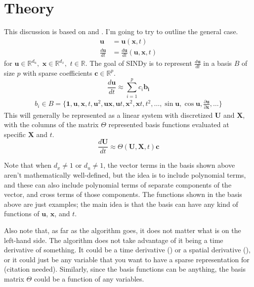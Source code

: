 \documentclass{article}
\let\vec\mathbf
\def\real{\mathbb{R}}
\begin{document}
\tableofcontents

\pagebreak
\section{Theory}

This discussion is based on \cite{brunton2016sindy} and \cite{shea2020sindy-bvp}.
I'm going to try to outline the general case. 
\begin{align}
\vec{u} &= \vec{u}(\vec{x}, t) \\
\frac{d\vec{u}}{dt} &= \frac{d\vec{u}}{dt}(\vec{u}, \vec{x}, t)
\end{align}
for $\vec{u} \in \real^{d_u}, \,\, \vec{x} \in \real^{d_x}, \,\, t \in \real$.
The goal of SINDy is to represent $\frac{d\vec{u}}{dt}$ in a basis $B$ of size
$p$ with sparse coefficients $\vec{c} \in \real^p$.
\begin{equation}
\frac{d\vec{u}}{dt} \approx \sum_{i=1}^p c_i \vec{b_i}
\end{equation}
\begin{align}
b_i \in B = \{\vec{1}, \vec{u}, \vec{x}, t, \vec{u}^2, \vec{u}\vec{x},\vec{u}t,\vec{x}^2,\vec{x}t,t^2,\hdots,\sin\vec{u},\cos{\vec{u}}, \frac{\partial\vec{u}}{\partial \vec{x}},\hdots\}
\end{align}
This will generally be represented as a linear system with discretized $\vec{U}$
and $\vec{X}$, with the columns of the matrix $\Theta$ represented basis
functions evaluated at specific $\vec{X}$ and $t$.
\begin{equation}\label{eq:basis-system}
\frac{d\vec{U}}{dt} \approx \Theta(\vec{U}, \vec{X}, t) \vec{c}
\end{equation}

Note that when $d_x \ne 1$ or $d_u \ne 1$, the vector terms in the basis shown above
aren't mathematically well-defined, but the idea is to include polynomial terms,
and these can also include polynomial terms of separate components of the
vector, and cross terms of those components. The functions shown in the basis
above are just examples; the main idea is that the basis can have any kind of
functions of $\vec{u}$, $\vec{x}$, and $t$.

Also note that, as far as the algorithm goes, it does not matter what is on the
left-hand side. The algorithm does not take advantage of it being a time
derivative of something. It could be a time derivative (\cite{brunton2016sindy})
or a spatial derivative (\cite{shea2020sindy-bvp}), or it could just be any
variable that you want to have a sparse representation for (citation needed).
Similarly, since the basis functions can be anything, the basis matrix $\Theta$
could be a function of any variables.
\end{document}
